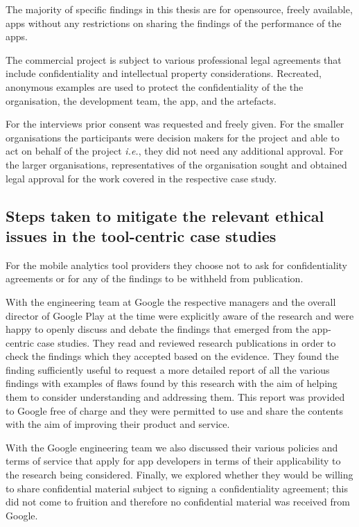 The majority of specific findings in this thesis are for opensource, freely available, apps without any restrictions on sharing the findings of the performance of the apps. 

The commercial project is subject to various professional legal agreements that include confidentiality and intellectual property considerations. Recreated, anonymous examples are used to protect the confidentiality of the the organisation, the development team, the app, and the artefacts.

For the interviews prior consent was requested and freely given. For the smaller organisations the participants were decision makers for the project and able to act on behalf of the project \textit{i.e.}, they did not need any additional approval. For the larger organisations, representatives of the organisation sought and obtained legal approval for the work covered in the respective case study.


\subsection{Steps taken to mitigate the relevant ethical issues in the tool-centric case studies}
For the mobile analytics tool providers they choose not to ask for confidentiality agreements or for any of the findings to be withheld from publication. 

With the engineering team at Google the respective managers and the overall director of Google Play at the time were explicitly aware of the research and were happy to openly discuss and debate the findings that emerged from the app-centric case studies. They read and reviewed research publications in order to check the findings which they accepted based on the evidence. They found the finding sufficiently useful to request a more detailed report of all the various findings with examples of flaws found by this research with the aim of helping them to consider understanding and addressing them. This report was provided to Google free of charge and they were permitted to use and share the contents with the aim of improving their product and service.

With the Google engineering team we also discussed their various policies and terms of service that apply for app developers in terms of their applicability to the research being considered. Finally, we explored whether they would be willing to share confidential material subject to signing a confidentiality agreement; this did not come to fruition and therefore no confidential material was received from Google.

